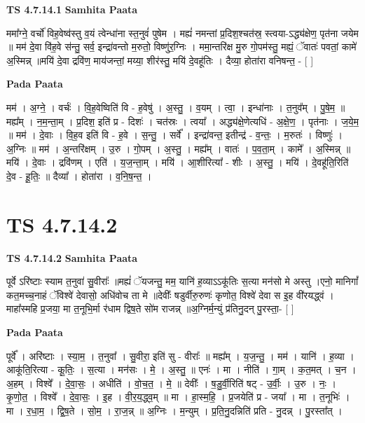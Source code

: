 \documentclass[17pt]{extarticle}
\begin{document}
\textbf{TS 4.7.14.1 } \newline
\textbf{Samhita Paata} \newline

ममा᳚ग्ने॒ वर्चो॑ विह॒वेष्व॑स्तु व॒यं त्वेन्धा॑ना स्त॒नुवं॑ पुषेम । मह्यं॑ नमन्तां प्र॒दिश॒श्चत॑स्र॒ स्त्वया-ऽद्ध्य॑क्षेण॒ पृत॑ना जयेम ॥ मम॑ दे॒वा वि॑ह॒वे स॑न्तु॒ सर्व॒ इन्द्रा॑वन्तो म॒रुतो॒ विष्णु॑र॒ग्निः । ममा॒न्तरि॑क्ष मु॒रु गो॒पम॑स्तु॒ मह्यं॒ ॅवातः॑ पवतां॒ कामे॑ अ॒स्मिन्न् ॥मयि॑ दे॒वा द्रवि॑ण॒ माय॑जन्तां॒ मय्या॒ शीर॑स्तु॒ मयि॑ दे॒वहू॑तिः । दैव्या॒ होता॑रा वनिषन्त॒ - [  ] \newline

\textbf{Pada Paata} \newline

मम॑ । अ॒ग्ने॒ । वर्चः॑ । वि॒ह॒वेष्विति॑ वि - ह॒वेषु॑ । अ॒स्तु॒ । व॒यम् । त्वा॒ । इन्धा॑नाः । त॒नुव᳚म् । पु॒षे॒म॒ ॥ मह्य᳚म् । न॒म॒न्ता॒म् । प्र॒दिश॒ इति॑ प्र - दिशः॑ । चत॑स्रः । त्वया᳚ । अद्ध्य॑क्षे॒णेत्यधि॑ - अ॒क्षे॒ण॒ । पृत॑नाः । ज॒ये॒म॒ ॥ मम॑ । दे॒वाः । वि॒ह॒व इति॑ वि - ह॒वे । स॒न्तु॒ । सर्वे᳚ । इन्द्रा॑वन्त॒ इतीन्द्र॑ - व॒न्तः॒ । म॒रुतः॑ । विष्णुः॑ । अ॒ग्निः ॥ मम॑ । अ॒न्तरि॑क्षम् । उ॒रु । गो॒पम् । अ॒स्तु॒ । मह्य᳚म् । वातः॑ । प॒व॒ता॒म् । कामे᳚ । अ॒स्मिन्न् ॥ मयि॑ । दे॒वाः । द्रवि॑णम् । एति॑ । य॒ज॒न्ता॒म् । मयि॑ । आ॒शीरित्या᳚ - शीः । अ॒स्तु॒ । मयि॑ । दे॒वहू॑ति॒रिति॑ दे॒व - हू॒तिः॒ ॥ दैव्या᳚ । होता॑रा । व॒नि॒ष॒न्त॒ ।  \newline




\section*{ TS 4.7.14.2 }

\textbf{TS 4.7.14.2 } \newline
\textbf{Samhita Paata} \newline

पूर्वे ऽरि॑ष्टाः स्याम त॒नुवा॑ सु॒वीराः᳚ ॥मह्यं॑ ॅयजन्तु॒ मम॒ यानि॑ ह॒व्याऽऽकू॑तिः स॒त्या मन॑सो मे अस्तु ।एनो॒ मानिगां᳚ कत॒मच्च॒नाहं ॅविश्वे॑ देवासो॒ अधि॑वोच ता मे ॥देवीः᳚ षडुर्वीरु॒रुणः॑ कृणोत॒ विश्वे॑ देवा स इ॒ह वी॑रयद्ध्वं ।माहा᳚स्महि प्र॒जया॒ मा त॒नूभि॒र्मा र॑धाम द्विष॒ते सो॑म राजन्न् ॥अ॒ग्निर्म॒न्युं प्र॑तिनु॒दन् पु॒रस्ता॒- [  ] \newline

\textbf{Pada Paata} \newline

पूर्वे᳚ । अरि॑ष्टाः । स्या॒म॒ । त॒नुवा᳚ । सु॒वीरा॒ इति॑ सु - वीराः᳚ ॥ मह्य᳚म् । य॒ज॒न्तु॒ । मम॑ । यानि॑ । ह॒व्या । आकू॑ति॒रित्या - कू॒तिः॒ । स॒त्या । मन॑सः । मे॒ । अ॒स्तु॒ ॥ एनः॑ । मा । नीति॑ । गा॒म् । क॒त॒मत् । च॒न । अ॒हम् । विश्वे᳚ । दे॒वा॒सः॒ । अधीति॑ । वो॒च॒त॒ । मे॒ ॥ देवीः᳚ । ष॒डु॒र्वी॒रिति॑ षट् - उ॒र्वीः॒ । उ॒रु । नः॒ । कृ॒णो॒त॒ । विश्वे᳚ । दे॒वा॒सः॒ । इ॒ह । वी॒र॒य॒द्ध्व॒म् ॥ मा । हा॒स्म॒हि॒ । प्र॒जयेति॑ प्र - जया᳚ । मा । त॒नूभिः॑ । मा । र॒धा॒म॒ । द्वि॒ष॒ते । सो॒म॒ । रा॒ज॒न्न् ॥ अ॒ग्निः । म॒न्युम् । प्र॒ति॒नु॒दन्निति॑ प्रति - नु॒दन्न् । पु॒रस्ता᳚त् ।  \newline
\end{document}
